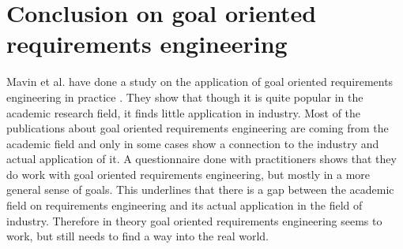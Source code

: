 \documentclass[11pt,a4paper]{article}
\begin{document}
\section{Conclusion on goal oriented requirements engineering}
Mavin et al. have done a study on the application of goal oriented
requirements engineering in practice \cite{Mavin.2017}. They show that though
it is quite popular in the academic research field, it finds little
application in industry. Most of the publications about goal oriented
requirements engineering are coming from the academic field and only in some
cases show a connection to the industry and actual application of it. A
questionnaire done with practitioners shows that they do work with goal
oriented requirements engineering, but mostly in a more general sense of
goals. This underlines that there is a gap between the academic field on
requirements engineering and its actual application in the field of
industry. Therefore in theory goal oriented requirements engineering seems to
work, but still needs to find a way into the real world.
\end{document}
